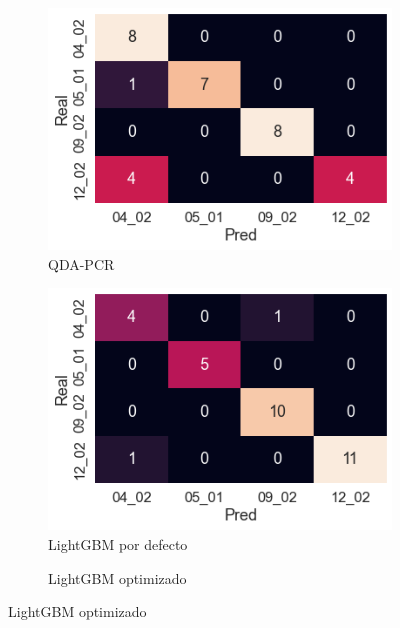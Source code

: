 \documentclass[12pt]{article}
\begin{document}
\begin{figure}[htbp]
\begin{subfigure}[b]{0.35\textwidth}
    \end{subfigure}
    \begin{subfigure}[b]{0.35\textwidth}
        \caption{QDA-PCR}
        \includegraphics[width=\textwidth]{QDAPCAR.png}
    \end{subfigure}
    \begin{subfigure}[b]{0.35\textwidth}
        \caption{LightGBM por defecto}
        \includegraphics[width=\textwidth]{LightGBMbase.png}
    \end{subfigure}
    \begin{subfigure}[b]{0.35\textwidth}
        \caption{LightGBM optimizado}

\end{subfigure}
\end{figure}
\end{document}

